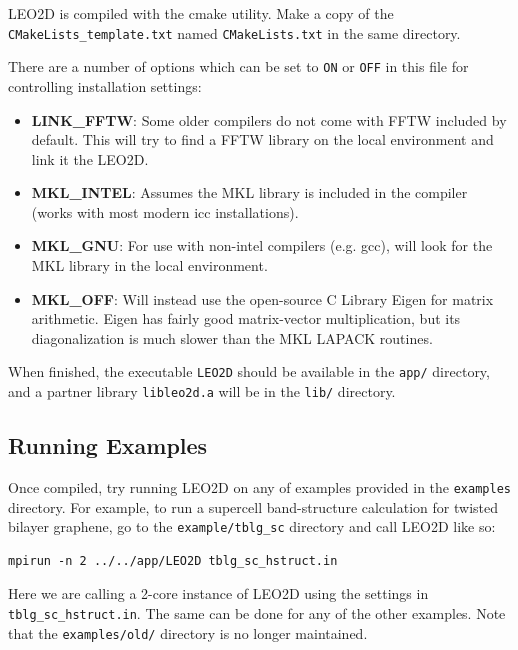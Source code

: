 \documentclass[10pt,a4paper]{article}
\begin{document}
LEO2D is compiled with the cmake utility.
Make a copy of the \texttt{CMakeLists\_template.txt} named \texttt{CMakeLists.txt} in the same directory.

There are a number of options which can be set to \texttt{ON} or \texttt{OFF} in this file for controlling installation settings:

\begin{itemize}
	\item \textbf{LINK\_FFTW}: Some older compilers do not come with FFTW included by default. This will try to find a FFTW library on the local environment and link it the LEO2D.
	\item \textbf{MKL\_INTEL}: Assumes the MKL library is included in the compiler (works with most modern icc installations).
	\item \textbf{MKL\_GNU}: For use with non-intel compilers (e.g. gcc), will look for the MKL library in the local environment.
	\item \textbf{MKL\_OFF}: Will instead use the open-source C Library Eigen for matrix arithmetic. Eigen has fairly good matrix-vector multiplication, but its diagonalization is much slower than the MKL LAPACK routines.
\end{itemize}

When finished, the executable \texttt{LEO2D} should be available in the \texttt{app/} directory, and a partner library \texttt{libleo2d.a} will be in the \texttt{lib/} directory.

\subsection{Running Examples}

Once compiled, try running LEO2D on any of examples provided in the \texttt{examples} directory.
For example, to run a supercell band-structure calculation for twisted bilayer graphene, go to the \texttt{example/tblg\_sc} directory and call LEO2D like so:

\begin{lstlisting}
mpirun -n 2 ../../app/LEO2D tblg_sc_hstruct.in
\end{lstlisting}

Here we are calling a 2-core instance of LEO2D using the settings in \texttt{tblg\_sc\_hstruct.in}.
The same can be done for any of the other examples.
Note that the \texttt{examples/old/} directory is no longer maintained.
\end{document}
